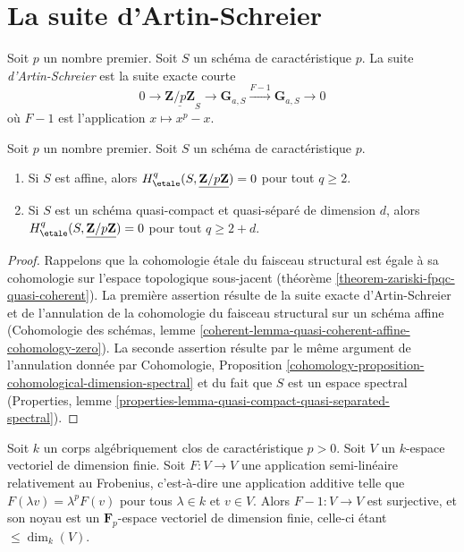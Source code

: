 \section{La suite d'Artin-Schreier}
\label{section-artin-schreier}

\noindent
Soit $p$ un nombre premier. Soit $S$ un sch\'ema de caract\'eristique $p$.
La suite {\it d'Artin-Schreier} est la suite exacte courte
$$
0 \longrightarrow \underline{\mathbf{Z}/p\mathbf{Z}}_S \longrightarrow
\mathbf{G}_{a, S} \xrightarrow{F-1} \mathbf{G}_{a, S} \longrightarrow 0
$$
o\`u $F - 1$ est l'application $x \mapsto x^p - x$.

\begin{lemma}
\label{lemma-vanishing-affine-char-p-p}
Soit $p$ un nombre premier. Soit $S$ un sch\'ema de caract\'eristique $p$.
\begin{enumerate}
\item Si $S$ est affine, alors
$H_\etale^q(S, \underline{\mathbf{Z}/p\mathbf{Z}}) = 0$ pour tout
$q \geq 2$.
\item Si $S$ est un sch\'ema quasi-compact et quasi-s\'epar\'e de
dimension $d$, alors $H_\etale^q(S, \underline{\mathbf{Z}/p\mathbf{Z}}) = 0$
pour tout $q \geq 2 + d$.
\end{enumerate}
\end{lemma}

\begin{proof}
Rappelons que la cohomologie \'etale du faisceau structural est \'egale
\`a sa cohomologie sur l'espace topologique sous-jacent
(théorème \ref{theorem-zariski-fpqc-quasi-coherent}).
La premi\`ere assertion r\'esulte de la suite exacte d'Artin-Schreier
et de l'annulation de la cohomologie du faisceau structural sur un sch\'ema
affine (Cohomologie des schémas, lemme
\ref{coherent-lemma-quasi-coherent-affine-cohomology-zero}).
La seconde assertion r\'esulte par le m\^eme argument de l'annulation
donn\'ee par Cohomologie, Proposition
\ref{cohomology-proposition-cohomological-dimension-spectral}
et du fait que $S$ est un espace spectral
(Properties, lemme
\ref{properties-lemma-quasi-compact-quasi-separated-spectral}).
\end{proof}

\begin{lemma}
\label{lemma-F-1}
Soit $k$ un corps alg\'ebriquement clos de caract\'eristique $p > 0$.
Soit $V$ un $k$-espace vectoriel de dimension finie. Soit $F : V \to V$
une application semi-lin\'eaire relativement au Frobenius, c'est-\`a-dire une application additive telle que
$F(\lambda v) = \lambda^p F(v)$ pour tous $\lambda \in k$ et $v \in V$.
Alors $F - 1 : V \to V$ est surjective, et son noyau est un
$\mathbf{F}_p$-espace vectoriel de dimension finie, celle-ci \'etant $\leq \dim_k(V)$.
\end{lemma}

